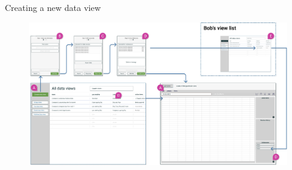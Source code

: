 \documentclass[aspectratio=169]{beamer}
\begin{document}
\begin{frame}{Creating a new data view}
    \begin{figure}[h]
        \centering
        \includegraphics[width=1\textwidth]{images/create-new-view-flow.png}
    \end{figure}
\end{frame}
\end{document}
